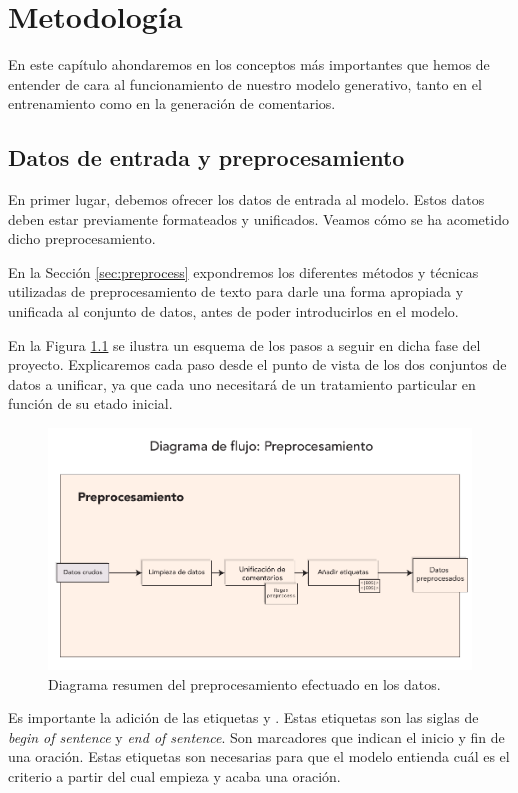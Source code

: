 \chapter{Metodología}

En este capítulo ahondaremos en los conceptos más importantes que hemos de entender de cara al funcionamiento de nuestro modelo generativo, tanto en el entrenamiento como en la generación de comentarios.



\section{Datos de entrada y preprocesamiento}
En primer lugar, debemos ofrecer los datos de entrada al modelo. Estos datos deben estar previamente formateados y unificados. Veamos cómo se ha acometido dicho preprocesamiento.

En la Sección \ref{sec:preprocess} expondremos los diferentes métodos y técnicas utilizadas de preprocesamiento de texto para darle una forma apropiada y unificada al conjunto de datos, antes de poder introducirlos en el modelo.

En la Figura \ref{fig:preprocess-diagram} se ilustra un esquema de los pasos a seguir en dicha fase del proyecto. Explicaremos cada paso desde el punto de vista de los dos conjuntos de datos a unificar, ya que cada uno necesitará de un tratamiento particular en función de su etado inicial.

\begin{figure}[h!]
	\centering
	\includegraphics[width=.9\textwidth]{media/preprocess.pdf}
	\caption{Diagrama resumen del preprocesamiento efectuado en los datos.}
	\label{fig:preprocess-diagram}
\end{figure}


Es importante la adición de las etiquetas  y . Estas etiquetas son las siglas de \textit{begin of sentence} y \textit{end of sentence}. Son marcadores que indican el inicio y fin de una oración. Estas etiquetas son necesarias para que el modelo entienda cuál es el criterio a partir del cual empieza y acaba una oración.

